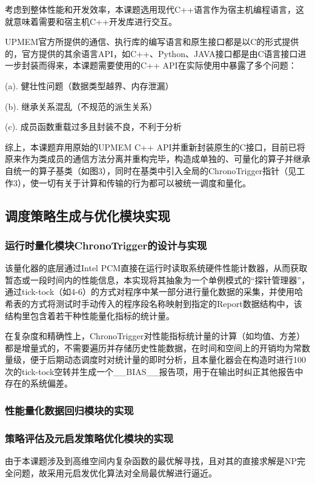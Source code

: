     考虑到整体性能和开发效率，本课题选用现代C++语言作为宿主机编程语言，这就意味着需要和宿主机C++开发库进行交互。

    UPMEM官方所提供的通信、执行库的编写语言和原生接口都是以C的形式提供的，官方提供的其余语言API，如C++、Python、JAVA接口都是由C语言接口进一步封装而得来，本课题需要使用的C++ API在实际使用中暴露了多个问题：

    (a). 健壮性问题（数据类型越界、内存泄漏）

    (b). 继承关系混乱（不规范的派生关系）

    (c). 成员函数重载过多且封装不良，不利于分析

    综上，本课题弃用原始的UPMEM C++ API并重新封装原生的C接口，目前已将原来作为类成员的通信方法分离并重构完毕，构造成单独的、可量化的算子并继承自统一的算子基类（如图3），同时在基类中引入全局的ChronoTrigger指针（见工作3），使一切有关于计算和传输的行为都可以被统一调度和量化。

  \subsection{调度策略生成与优化模块实现}\label{subsubsec:scheduleGen_module_impl}
    \subsubsection{运行时量化模块ChronoTrigger的设计与实现}\label{subsubsec:ChronoTrigger_impl}
    该量化器的底层通过Intel PCM直接在运行时读取系统硬件性能计数器，从而获取暂态或一段时间内的性能信息，本实现将其抽象为一个单例模式的“探针管理器”，通过tick-tock（如4-6）的方式对程序中某一部分进行量化数据的采集，并使用哈希表的方式将测试时手动传入的程序段名称映射到指定的Report数据结构中，该结构里包含着若干种性能量化指标的统计量。

    在复杂度和精确性上，ChronoTrigger对性能指标统计量的计算（如均值、方差）都是增量式的，不需要遍历并存储历史性能数据，在时间和空间上的开销均为常数量级，便于后期动态调度时对统计量的即时分析，且本量化器会在构造时进行100次的tick-tock空转并生成一个\_\_BIAS\_\_报告项，用于在输出时纠正其他报告中存在的系统偏差。
    \subsubsection{性能量化数据回归模块的实现}\label{subsubsec:perfRegressor_impl}
    \subsubsection{策略评估及元启发策略优化模块的实现}\label{subsubsec:eval_optimizer_impl}
    由于本课题涉及到高维空间内复杂函数的最优解寻找，且对其的直接求解是NP完全问题，故采用元启发优化算法对全局最优解进行逼近。

